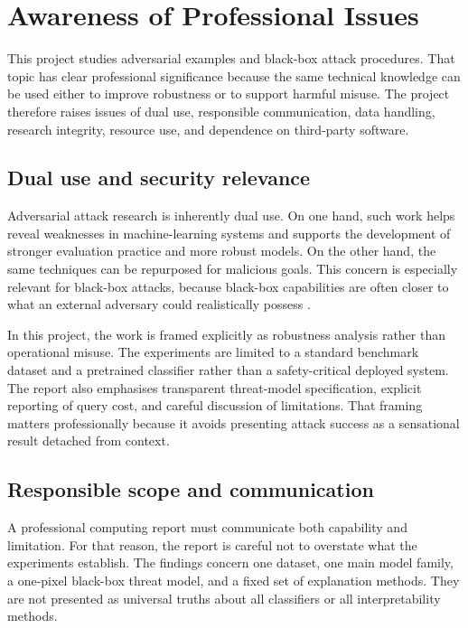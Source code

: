 \section{Awareness of Professional Issues}
\label{sec:professional_issues}

This project studies adversarial examples and black-box attack procedures.
That topic has clear professional significance because the same technical knowledge can be used either to improve robustness or to support harmful misuse.
The project therefore raises issues of dual use, responsible communication, data handling, research integrity, resource use, and dependence on third-party software.

\subsection{Dual use and security relevance}
Adversarial attack research is inherently dual use.
On one hand, such work helps reveal weaknesses in machine-learning systems and supports the development of stronger evaluation practice and more robust models.
On the other hand, the same techniques can be repurposed for malicious goals.
This concern is especially relevant for black-box attacks, because black-box capabilities are often closer to what an external adversary could realistically possess \cite{papernot2017practical}.

In this project, the work is framed explicitly as robustness analysis rather than operational misuse.
The experiments are limited to a standard benchmark dataset and a pretrained classifier rather than a safety-critical deployed system.
The report also emphasises transparent threat-model specification, explicit reporting of query cost, and careful discussion of limitations.
That framing matters professionally because it avoids presenting attack success as a sensational result detached from context.

\subsection{Responsible scope and communication}
A professional computing report must communicate both capability and limitation.
For that reason, the report is careful not to overstate what the experiments establish.
The findings concern one dataset, one main model family, a one-pixel black-box threat model, and a fixed set of explanation methods.
They are not presented as universal truths about all classifiers or all interpretability methods.

